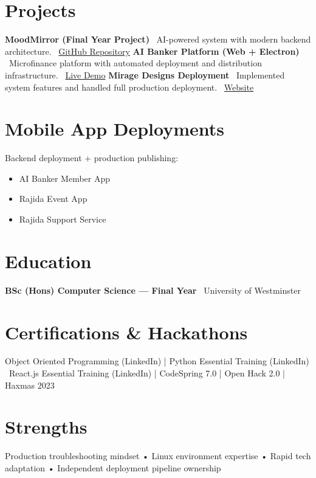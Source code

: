 \documentclass[10pt,a4paper]{article}
\begin{document}
\section*{Projects}
\textbf{MoodMirror (Final Year Project)} \
AI-powered system with modern backend architecture. \
\href{https://github.com/KavinduPramod/moodmirror}{GitHub Repository}
\vspace{4pt}
\textbf{AI Banker Platform (Web + Electron)} \
Microfinance platform with automated deployment and distribution infrastructure. \
\href{https://demo.aibanker.cloud/login}{Live Demo}
\vspace{4pt}
\textbf{Mirage Designs Deployment} \
Implemented system features and handled full production deployment. \
\href{https://miragedesigns.lk/}{Website}

\section*{Mobile App Deployments}
Backend deployment + production publishing:
\begin{itemize}
\item AI Banker Member App
\item Rajida Event App
\item Rajida Support Service
\end{itemize}

\section*{Education}
\textbf{BSc (Hons) Computer Science — Final Year} \
University of Westminster

\section*{Certifications \& Hackathons}
Object Oriented Programming (LinkedIn) \quad | \quad Python Essential Training (LinkedIn) \
React.js Essential Training (LinkedIn) \quad | \quad CodeSpring 7.0 \quad | \quad Open Hack 2.0 \quad | \quad Haxmas 2023

\section*{Strengths}
Production troubleshooting mindset • Linux environment expertise • Rapid tech adaptation • Independent deployment pipeline ownership
\end{document}
